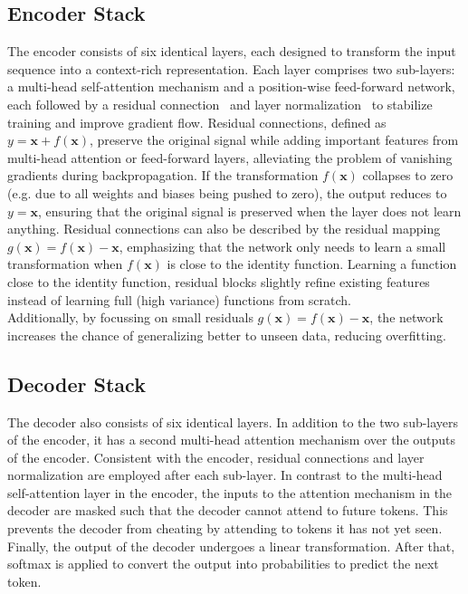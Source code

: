 \subsection{Encoder Stack} 
The encoder consists of six identical layers, each designed to transform the input sequence into a context-rich representation.
Each layer comprises two sub-layers: a multi-head self-attention mechanism and a position-wise feed-forward network, each followed by a residual connection~\cite{he2015deepresiduallearningimage} and layer normalization~\cite{ba2016layernormalization} to stabilize training and improve gradient flow.
Residual connections, defined as  \(y = \mathbf{x} + f(\mathbf{x})\), preserve the original signal while adding important features from multi-head attention or feed-forward layers, alleviating the problem of vanishing gradients during backpropagation.
If the transformation \(f(\mathbf{x})\) collapses to zero (e.g. due to all weights and biases being pushed to zero), the output reduces to \(y = \mathbf{x}\), ensuring that the original signal is preserved when the layer does not learn anything.
Residual connections can also be described by the residual mapping \(g(\mathbf{x}) = f(\mathbf{x}) - \mathbf{x}\), emphasizing that the network only needs to learn a small transformation when \(f(\mathbf{x})\) is close to the identity function.
Learning a function close to the identity function, residual blocks slightly refine existing features instead of learning full (high variance) functions from scratch. \\
Additionally, by focussing on small residuals \(g(\mathbf{x}) = f(\mathbf{x}) - \mathbf{x}\), the network increases the chance of generalizing better to unseen data, reducing overfitting.

\subsection{Decoder Stack} 
The decoder also consists of six identical layers.
In addition to the two sub-layers of the encoder, it has a second multi-head attention mechanism over the outputs of the encoder.
Consistent with the encoder, residual connections and layer normalization are employed after each sub-layer.
In contrast to the multi-head self-attention layer in the encoder, the inputs to the attention mechanism in the decoder are masked such that the decoder cannot attend to future tokens.
This prevents the decoder from cheating by attending to tokens it has not yet seen.
Finally, the output of the decoder undergoes a linear transformation. After that, softmax is applied to convert the output into probabilities to predict the next token.


